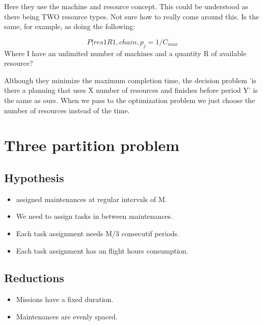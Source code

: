 \documentclass[a4paper,11pt]{article}
\begin{document}
    Here they use the machine and resource concept. This could be understood as there being TWO resource types. Not sure how to really come around this. Is the same, for example, as doing the following:

    $$P| res1R1, chain, p_j = 1 / C_{max}$$ Where I have an unlimited number of machines and a quantity R of available resource?

    Although they minimize the maximum completion time, the decision problem 'is there a planning that uses X number of resources and finishes before period Y' is the same as ours. When we pass to the optimization problem we just choose the number of resources instead of the time.


\clearpage

\section{Three partition problem}



    \subsection{Hypothesis}

    \begin{itemize}
     \item assigned maintenances at regular intervals of M.
     \item We need to assign tasks in between maintenances.
     \item Each task assignment needs M/3 consecutif periods.
     \item Each task assignment has an flight hours consumption.
    \end{itemize}

    \subsection{Reductions}

    \begin{itemize}
        \item Missions have a fixed duration.
        \item Maintenances are evenly spaced.
    \end{itemize}
\end{document}
